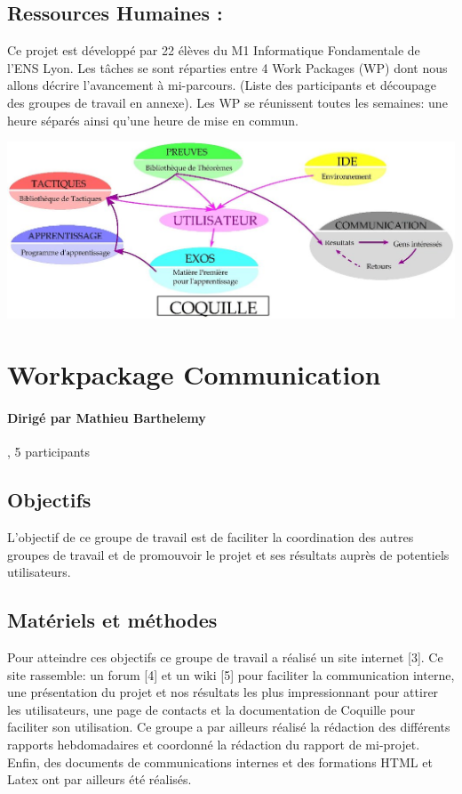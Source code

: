 \documentclass[a4paper,10pt]{article}
\begin{document}
\subsection{Ressources Humaines :} 

Ce projet est développé par 22 élèves du M1 Informatique Fondamentale de l’ENS Lyon. 
Les tâches se sont réparties entre 4 Work Packages (WP) dont nous allons décrire l'avancement à mi-parcours. 
(Liste des participants et découpage des groupes de travail en annexe). 
Les WP se réunissent toutes les semaines: une heure séparés ainsi qu'une heure de mise en commun.

\includegraphics[scale=0.6]{organisation.jpg}

\section{Workpackage Communication}
\paragraph{Dirigé par Mathieu Barthelemy}, 5 participants

\subsection{Objectifs}
L'objectif de ce groupe de travail est de faciliter la coordination des autres groupes de travail et de promouvoir le projet et ses résultats auprès de potentiels utilisateurs.


\subsection{Matériels et méthodes}
Pour atteindre ces objectifs ce groupe de travail a réalisé un site internet [3]. Ce site rassemble: un forum [4] et un wiki [5] pour faciliter la communication interne,
 une présentation du projet et nos résultats les plus impressionnant pour attirer les utilisateurs, une page de contacts et la documentation de Coquille
 pour faciliter son utilisation.
Ce groupe a par ailleurs réalisé la rédaction des différents rapports hebdomadaires et coordonné la rédaction du rapport de mi-projet. 
Enfin, des documents de communications internes et des formations HTML et Latex ont par ailleurs été réalisés.
\end{document}
